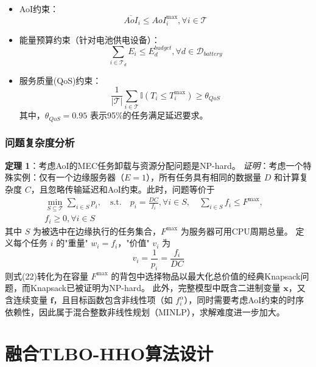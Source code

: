 \documentclass[conference]{IEEEtran}
\begin{document}
\begin{itemize}
    \item AoI约束：
        \begin{equation}
            \overline{AoI}_i \leq AoI_i^{\max}, \forall i \in \mathcal{T}
        \end{equation}
    \item 能量预算约束（针对电池供电设备）：
        \begin{equation}
            \sum_{i \in \mathcal{T}_d} E_i \leq E_{d}^{budget}, \forall d \in \mathcal{D}_{battery}
        \end{equation}
    \item 服务质量(QoS)约束：
        \begin{equation}
            \frac{1}{|\mathcal{T}|} \sum_{i \in \mathcal{T}} \mathbb{I}(T_i \leq T_i^{\max}) \geq \theta_{QoS}
        \end{equation}
        其中，$\theta_{QoS} = 0.95$ 表示95\%的任务满足延迟要求。
\end{itemize}

\subsubsection{问题复杂度分析}
\textbf{定理 1}：考虑AoI的MEC任务卸载与资源分配问题是NP-hard。
\textit{证明}：考虑一个特殊实例：仅有一个边缘服务器（$E = 1$），所有任务具有相同的数据量 $D$ 和计算复杂度 $C$，且忽略传输延迟和AoI约束。此时，问题等价于
\begin{equation}
    \begin{split}
        \min_{S \subseteq \mathcal{T}} \sum_{i \in S} p_i, \quad
        \text{s.t.} \quad p_i = \frac{DC}{f_i}, \forall i \in S, \quad 
        \sum_{i \in S} f_i \leq F^{\max}, \quad \\
        f_i \geq 0, \forall i \in S
    \end{split}
\end{equation}
其中 $S$ 为被选中在边缘执行的任务集合，$F^{\max}$ 为服务器可用CPU周期总量。
定义每个任务 $i$ 的"重量" $w_i = f_i$，"价值" $v_i$ 为
\begin{equation}
v_i = \frac{1}{p_i} = \frac{f_i}{DC}
\end{equation}
则式(22)转化为在容量 $F^{\max}$ 的背包中选择物品以最大化总价值的经典Knapsack问题，而Knapsack已被证明为NP-hard。
此外，完整模型中既含二进制变量 $\mathbf{x}$，又含连续变量 $\mathbf{f}$，且目标函数包含非线性项（如 $f_i^{\alpha}$），同时需要考虑AoI约束的时序依赖性，因此属于混合整数非线性规划（MINLP），求解难度进一步加大。
\section{融合TLBO-HHO算法设计}
\end{document}
